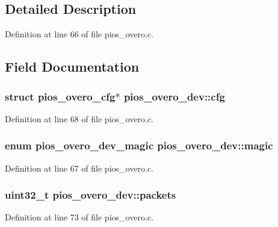 \subsection{\-Detailed \-Description}


\-Definition at line 66 of file pios\-\_\-overo.\-c.



\subsection{\-Field \-Documentation}
\hypertarget{structpios__overo__dev_a8bb10a548957bcd5da841fcd655b14d2}{
\subsubsection[{cfg}]{\setlength{\rightskip}{0pt plus 5cm}struct {\bf pios\-\_\-overo\-\_\-cfg}$\ast$ {\bf pios\-\_\-overo\-\_\-dev\-::cfg}}}\label{structpios__overo__dev_a8bb10a548957bcd5da841fcd655b14d2}


\-Definition at line 68 of file pios\-\_\-overo.\-c.

\hypertarget{structpios__overo__dev_a6d9be49c3c20b721ac63620ce90d30ae}{
\subsubsection[{magic}]{\setlength{\rightskip}{0pt plus 5cm}enum {\bf pios\-\_\-overo\-\_\-dev\-\_\-magic} {\bf pios\-\_\-overo\-\_\-dev\-::magic}}}\label{structpios__overo__dev_a6d9be49c3c20b721ac63620ce90d30ae}


\-Definition at line 67 of file pios\-\_\-overo.\-c.

\hypertarget{structpios__overo__dev_ad0b4a0ccb4fb05b14cc21805b5dbe9b9}{
\subsubsection[{packets}]{\setlength{\rightskip}{0pt plus 5cm}uint32\-\_\-t {\bf pios\-\_\-overo\-\_\-dev\-::packets}}}\label{structpios__overo__dev_ad0b4a0ccb4fb05b14cc21805b5dbe9b9}


\-Definition at line 73 of file pios\-\_\-overo.\-c.

